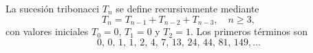La sucesión tribonacci \(T_n\) se define recursivamente mediante
\[
T_n = T_{n-1} + T_{n-2} + T_{n-3}, \quad n \ge 3,
\]
con valores iniciales \(T_0=0\), \(T_1=0\) y \(T_2=1\). Los primeros términos son
\[
0,\,0,\,1,\,1,\,2,\,4,\,7,\,13,\,24,\,44,\,81,\,149,\dots
\]
